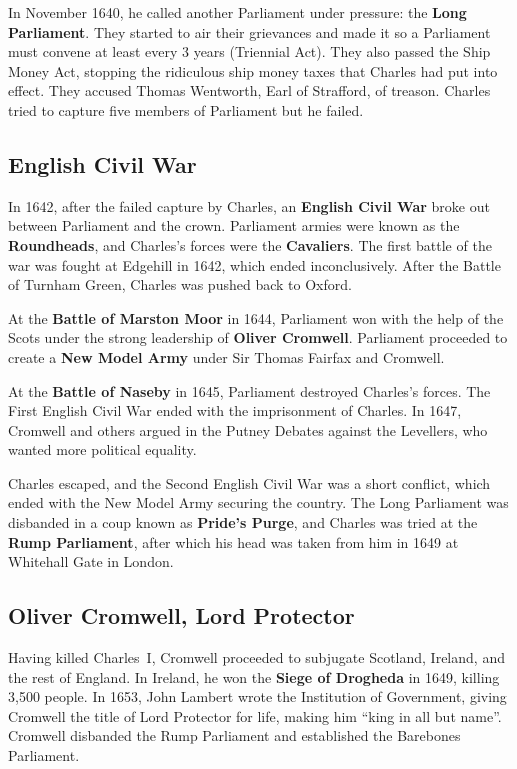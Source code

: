 In November 1640, he called another Parliament under pressure: the \textbf{Long Parliament}.
They started to air their grievances
and made it so a Parliament must convene at least every 3 years (Triennial Act).
They also passed the Ship Money Act, stopping the ridiculous ship money taxes that Charles had put into effect.
They accused Thomas Wentworth, Earl of Strafford, of treason.
Charles tried to capture five members of Parliament but he failed.

\subsection*{English Civil War}

In 1642, after the failed capture by Charles,
an \textbf{English Civil War} broke out between Parliament and the crown.
Parliament armies were known as the \textbf{Roundheads}, and Charles's forces were the \textbf{Cavaliers}.
The first battle of the war was fought at Edgehill in 1642, which ended inconclusively.
After the Battle of Turnham Green, Charles was pushed back to Oxford.

At the \textbf{Battle of Marston Moor} in 1644,
Parliament won with the help of the Scots under the strong leadership of \textbf{Oliver Cromwell}.
Parliament proceeded to create a \textbf{New Model Army} under Sir Thomas Fairfax and Cromwell.

At the \textbf{Battle of Naseby} in 1645, Parliament destroyed Charles's forces.
The First English Civil War ended with the imprisonment of Charles.
In 1647, Cromwell and others argued in the Putney Debates against the Levellers,
who wanted more political equality.

Charles escaped, and the Second English Civil War was a short conflict,
which ended with the New Model Army securing the country.
The Long Parliament was disbanded in a coup known as \textbf{Pride's Purge},
and Charles was tried at the \textbf{Rump Parliament},
after which his head was taken from him in 1649 at Whitehall Gate in London.

\subsection*{Oliver Cromwell, Lord Protector}

Having killed Charles~I, Cromwell proceeded to subjugate Scotland, Ireland, and the rest of England.
In Ireland, he won the \textbf{Siege of Drogheda} in 1649, killing 3,500 people.
In 1653, John Lambert wrote the Institution of Government, giving Cromwell the title of Lord Protector for life,
making him ``king in all but name''.
Cromwell disbanded the Rump Parliament and established the Barebones Parliament.

